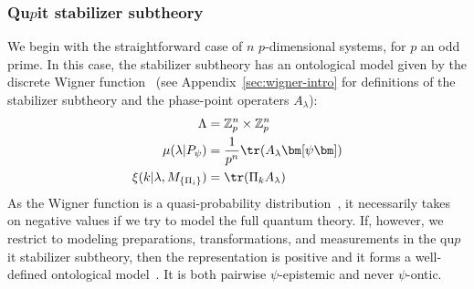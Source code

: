 \documentclass[%
 reprint,
superscriptaddress,
nofootinbib,
 amsmath,amssymb,
 prx, 
 accepted=2019-09-27,
]{quantumarticle}
\newcommand{\proj}[1]{{\bm[}#1{\bm]}}
\begin{document}
\subsubsection{Qu$p$it stabilizer subtheory}
\label{sec:quopit-wigner-model}


We begin with the straightforward case of $n$ $p$-dimensional systems,
for $p$ an odd prime. In this case, the stabilizer subtheory has an
ontological model given by the discrete Wigner
function~\cite{VeitchResourceTheoryStabilizer2014,GrossHudsonTheoremfinitedimensional2006}
(see Appendix~\ref{sec:wigner-intro} for definitions of the stabilizer
subtheory and the phase-point operaters $A_\lambda$):
\begin{align}
  \Lambda &= \mathbb{Z}_p^n\times\mathbb{Z}_p^n\nonumber\\
  \mu(\lambda|P_\psi) &= \frac{1}{p^n}\tr(A_\lambda\proj\psi)\nonumber\\
  \xi(k|\lambda,M_{\{\Pi_i\}}) &= \tr(\Pi_kA_\lambda)
\end{align}
As the Wigner function is a quasi-probability
distribution~\cite{FerrieQuasiprobabilityrepresentationsquantum2011},
it necessarily takes on negative values if we try to model the full
quantum theory. If, however, we restrict to modeling preparations,
transformations, and measurements in the qu$p$it stabilizer subtheory,
then the representation is positive and it forms a well-defined
ontological
model~\cite{GrossNonnegativeWignerfunctions2007,GrossHudsonTheoremfinitedimensional2006}. It
is both pairwise $\psi$-epistemic and never $\psi$-ontic.
\end{document}
